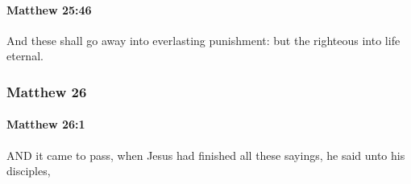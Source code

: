 		\paragraph{Matthew 25:46} %
			\label{MATTHEW-25-46}

			And these shall go away into everlasting punishment: but the righteous into life eternal.

			\begin{framed}
			\scriptsize
				\begin{compactdesc}
					\item[SBLG] 
				\end{compactdesc}
			\end{framed}

	\subsubsection{Matthew 26} %
		\label{MATTHEW-26}
		
		\paragraph{Matthew 26:1} %
			\label{MATTHEW-26-1}

			AND it came to pass, when Jesus had finished all these sayings, he said unto his disciples,

